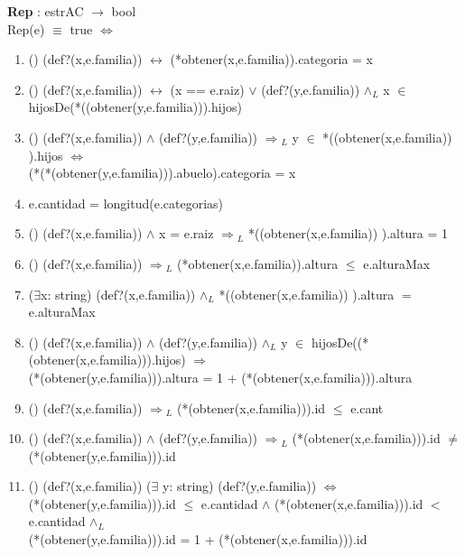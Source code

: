 \documentclass[10pt, a4paper]{article}
\begin{document}
	
	   \textbf{Rep} : estrAC $\longrightarrow$ bool\\
	        Rep(e) $\equiv$ true $\Longleftrightarrow$\\
	
	   \begin{enumerate}

	    \item() (def?(x,e.familia)) $\leftrightarrow$ (*obtener(x,e.familia)).categoria = x  
	  
	    \item() (def?(x,e.familia)) $\leftrightarrow$ (x == e.raiz) $\vee$ (def?(y,e.familia)) $\wedge{_L}$ x $\in$ hijosDe(*((obtener(y,e.familia))).hijos)
	       
	    \item () (def?(x,e.familia)) $\wedge$ (def?(y,e.familia)) $\Rightarrow{_L}$ y $\in$ *((obtener(x,e.familia)) ).hijos $\Leftrightarrow$ \\ (*(*(obtener(y,e.familia))).abuelo).categoria = x

	    \item e.cantidad  = longitud(e.categorias)
	    
	    \item () (def?(x,e.familia)) $\wedge$ x = e.raiz $\Rightarrow{_L}$ *((obtener(x,e.familia)) ).altura = 1
	    
	    \item () (def?(x,e.familia)) $\Rightarrow{_L}$ (*obtener(x,e.familia)).altura $\leq$ e.alturaMax
	    
	    \item ($\exists$x: string) (def?(x,e.familia)) $\wedge{_L}$ *((obtener(x,e.familia)) ).altura $=$ e.alturaMax
	    
	    \item () (def?(x,e.familia)) $\wedge$ (def?(y,e.familia)) $\wedge{_L}$ y $\in$ hijosDe((*(obtener(x,e.familia))).hijos) $\Rightarrow$ \\ (*(obtener(y,e.familia))).altura = 1 + (*(obtener(x,e.familia))).altura
	    
	    \item () (def?(x,e.familia)) $\Rightarrow{_L}$ (*(obtener(x,e.familia))).id $\leq$ e.cant
	    
	    \item () (def?(x,e.familia)) $\wedge$ (def?(y,e.familia)) $\Rightarrow{_L}$ (*(obtener(x,e.familia))).id $\neq$ (*(obtener(y,e.familia))).id
	    
	    \item () (def?(x,e.familia)) ($\exists$ y: string) (def?(y,e.familia)) $\Leftrightarrow$ \\ (*(obtener(y,e.familia))).id $\leq$ e.cantidad $\wedge$ (*(obtener(x,e.familia))).id $<$ e.cantidad $\wedge{_L}$ \\(*(obtener(y,e.familia))).id = 1 + (*(obtener(x,e.familia))).id
	    
\end{enumerate}
\end{document}
